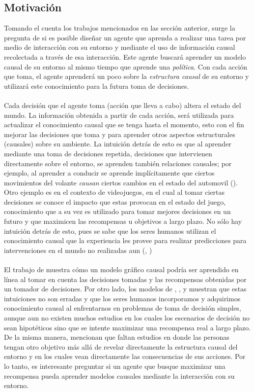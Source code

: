 \documentclass[11pt]{article}
\theoremstyle{plain}
\begin{document}
\subsection{Motivación}
Tomando el cuenta los trabajos mencionados en las sección anterior, surge la pregunta de si es posible diseñar un agente que aprenda a realizar una tarea por medio de interacción con su entorno y mediante el uso de información causal recolectada a través de esa interacción. Este agente buscará aprender un modelo causal de su entorno al mismo tiempo que aprende una \textit{política}. Con cada acción que toma, el agente aprenderá  un poco sobre la \textit{estructura causal} de su entorno y utilizará este conocimiento para la futura toma de decisiones.\\
\\
Cada decisión que el agente toma (acción que lleva a cabo) altera el estado del mundo. La información obtenida a partir de cada acción, será utilizada para actualizar el conocimiento causal que se tenga hasta el momento, esto con el fin mejorar las decisiones que toma y para aprender otros aspectos estructurales (causales) sobre su ambiente. La intuición detrás de esto es que al aprender mediante una toma de decisiones repetida, decisiones que intervienen directamente sobre el entorno, se aprenden también relaciones causales; por ejemplo, al aprender a conducir se aprende implícitamente que ciertos movimientos del volante \textit{causan} ciertos cambios en el estado del automovil (\cite{danks2014unifying}). Otro ejemplo es en el contexto de videojuegos, en el cual al tomar ciertas decisiones se conoce el impacto que estas provocan en el estado del juego, conocimiento que a su vez es utilizado para tomar mejores decisiones en un futuro y que maximicen las recompensas u objetivos a largo plazo. No sólo hay intuición detrás de esto, pues se sabe que los seres humanos utilizan el conocimiento causal que la experiencia les provee para realizar predicciones para intervenciones en el mundo no realizadas aun (\cite{meder2008inferring}, \cite{hagmayer2009decision})\\
\\
El trabajo de \cite{wellen2012learning} muestra cómo un modelo gráfico causal podría ser aprendido en línea al tomar en cuenta las decisiones tomadas y las recompensas obtenidas por un tomador de decisiones. Por otro lado, los modelos de \cite{sloman2006causal}, \cite{meder2008inferring}, \cite{hagmayer2009decision} y \cite{hagmayer2013repeated} muestran que estas intuiciones no son erradas y que los seres humanos incorporamos y adquirimos conocimiento causal al enfrentarnos en problemas de toma de decisión simples, aunque aun no existen muchos estudios en los cuales los escenarios de decisión no sean hipotéticos sino que se intente maximizar una recompensa real a largo plazo. De la misma manera, \cite{hagmayer2013repeated} mencionan que faltan estudios en donde las personas tengan otro objetivo más allá de revelar directamente la estructura causal del entorno y en los cuales vean directamente las consecuencias de sus acciones. Por lo tanto, es interesante preguntar si un agente que busque maximizar una recompensa pueda aprender modelos causales mediante la interacción con su entorno.
\end{document}

